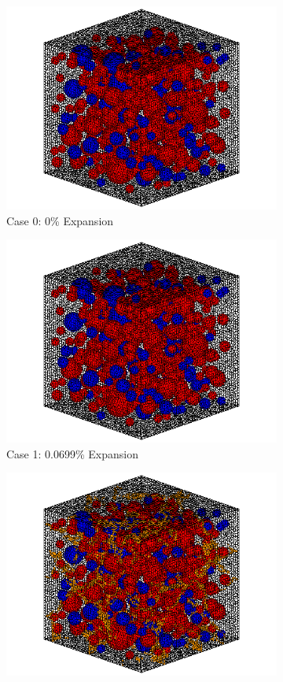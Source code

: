 \begin{figure}[!h]
\centering

    \begin{subfigure}{.5\textwidth}
      \centering
      \includegraphics[width=.8\linewidth]{Files/exp_3D/ASR/A15P75_1_c.png}
    \caption{Case 0: 0\% Expansion}
    \end{subfigure}%
    \begin{subfigure}{.5\textwidth}
      \centering
      \includegraphics[width=.8\linewidth]{Files/exp_3D/ASR/A15P75_1_c.png}
    \caption{Case 1: 0.0699\% Expansion}
    \end{subfigure}
    \begin{subfigure}{.5\textwidth}
      \centering
      \includegraphics[width=.8\linewidth]{Files/exp_3D/ASR/A15P75_2_c.png}

\end{subfigure}
\end{figure}
